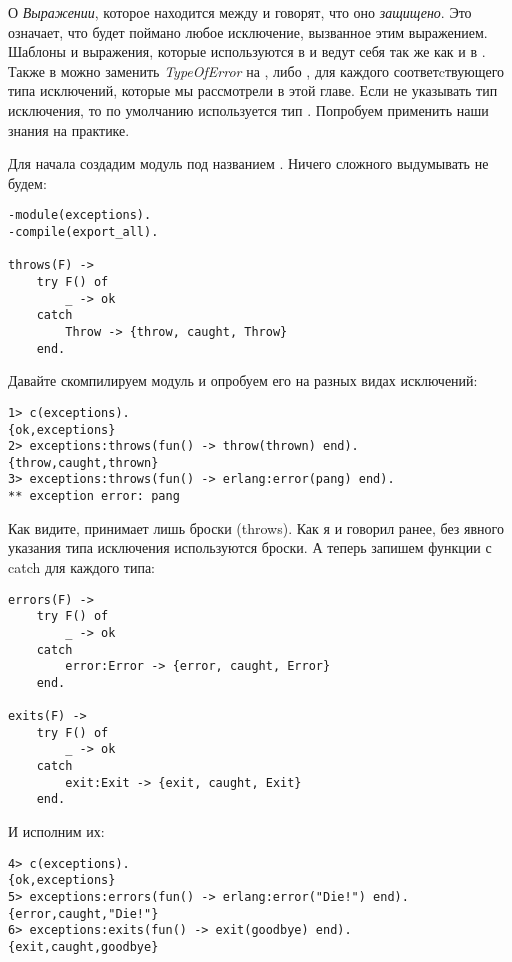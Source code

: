 О \emph{Выражении}, которое находится между  и  говорят, что оно \emph{защищено}. Это означает, что будет поймано любое исключение, вызванное этим выражением.
Шаблоны и выражения, которые используются в  и  ведут себя так же как и в .
Также в  можно заменить \emph{TypeOfError} на ,  либо , для каждого соответcтвующего типа исключений, которые мы рассмотрели в этой главе.
Если не указывать тип исключения, то по умолчанию используется тип .
Попробуем применить наши знания на практике.

Для начала создадим модуль под названием .
Ничего сложного выдумывать не будем:
\begin{lstlisting}[style=erlang]
-module(exceptions).
-compile(export_all).
 
throws(F) ->
    try F() of
        _ -> ok
    catch
        Throw -> {throw, caught, Throw}
    end.
\end{lstlisting}

Давайте скомпилируем модуль и опробуем его на разных видах исключений:
\begin{lstlisting}[style=erlang]
1> c(exceptions).
{ok,exceptions}
2> exceptions:throws(fun() -> throw(thrown) end).
{throw,caught,thrown}
3> exceptions:throws(fun() -> erlang:error(pang) end).
** exception error: pang
\end{lstlisting}

Как видите,  принимает лишь броски (throws).
Как я и говорил ранее, без явного указания типа исключения используются броски.
А теперь запишем функции с catch для каждого типа:
\begin{lstlisting}[style=erlang]
errors(F) ->
    try F() of
        _ -> ok
    catch
        error:Error -> {error, caught, Error}
    end.
 
exits(F) ->
    try F() of
        _ -> ok
    catch
        exit:Exit -> {exit, caught, Exit}
    end.
\end{lstlisting}

И исполним их:
\begin{lstlisting}[style=erlang]
4> c(exceptions).
{ok,exceptions}
5> exceptions:errors(fun() -> erlang:error("Die!") end).
{error,caught,"Die!"}
6> exceptions:exits(fun() -> exit(goodbye) end).
{exit,caught,goodbye}
\end{lstlisting}

